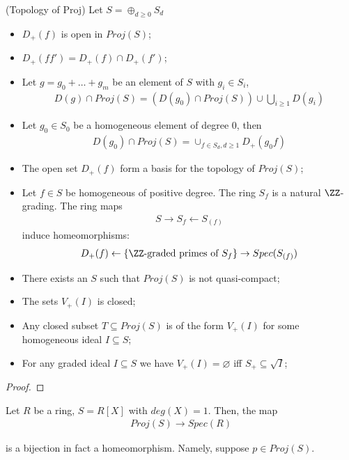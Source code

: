 \documentclass[Total.tex]{subfiles}
\begin{document}
			\begin{lemma}
				(Topology of Proj) Let $S=\oplus_{d\geq 0}S_d$
				\begin{itemize}
					\item $D_+(f)$ is open in $Proj(S)$;
					\item $D_+(ff')=D_+(f)\cap D_+(f')$;
					\item Let $g=g_0+\dots+g_m$ be an element of $S$ with $g_i\in S_i$,
					\begin{gather*}
						D(g)\cap Proj(S)=(D(g_0)\cap Proj(S))\cup \bigcup_{i\geq 1} D(g_i)
					\end{gather*}
					\item Let $g_0\in S_0$ be a homogeneous element of degree $0$, then 
					\begin{gather*}
						D(g_0)\cap Proj(S)=\cup_{f\in S_d,d\geq 1} D_+(g_0f)
					\end{gather*}
					\item The open set $D_+(f)$ form a basis for the topology of $Proj(S)$;
					\item Let $f\in S$ be homogeneous of positive degree. The ring $S_f$ is a natural $\ZZ$-grading. The ring maps
					\begin{gather*}
						S\rightarrow S_f\leftarrow S_{(f)}
					\end{gather*}
					induce homeomorphisms:
					\begin{gather*}
						D_+(f)\leftarrow \{\ZZ\mbox{-graded primes of }S_f\}\rightarrow Spec(S_{(f)})
					\end{gather*}
					\item There exists an $S$ such that $Proj(S)$ is not quasi-compact;
					\item The sets $V_+(I)$ is closed;
					\item Any closed subset $T\subseteq Proj(S)$ is of the form $V_+(I)$ for some homogeneous ideal $I\subseteq S$;
					\item For any graded ideal $I\subseteq S$ we have $V_+(I)=\varnothing$ iff $S_+\subseteq \sqrt{I}$;
				\end{itemize}
			\end{lemma}
			\begin{proof}
			\end{proof}
			
			\begin{example}
				Let $R$ be a ring, $S=R[X]$ with $deg(X)=1$. Then, the map
				\begin{gather*}
					Proj(S)\rightarrow Spec(R)
				\end{gather*}
				
				is a bijection in fact a homeomorphism. Namely, suppose $p\in Proj(S)$. 
			\end{example}
			
\end{document}
